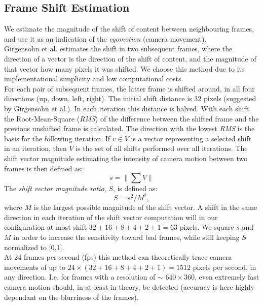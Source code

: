 \subsection{Frame Shift Estimation}\label{sec:frame_shift_estimation}
%
We estimate the magnitude of the shift of content between neighbouring frames, and use it as an indication of the \textit{egomotion} (camera movement).\\
Girgensohn et al.\cite{Girgensohn:2000:SAH:354401.354415} estimates the shift in two subsequent frames, where the direction of a vector is the direction of the shift of content, and the magnitude of that vector how many pixels it was shifted. We choose this method due to its implementational simplicity and low computational costs.\\
For each pair of subsequent frames, the latter frame is shifted around, in all four directions (up, down, left, right). The initial shift distance is 32 pixels (suggested by Girgensohn et al.). In each iteration this distance is halved. 
With each shift the Root-Mean-Square (\textit{RMS}) of the difference between the shifted frame and the previous unshifted frame is calculated. The direction with the lowest \textit{RMS} is the basis for the following iteration.
%
If $v \in V$ is a vector representing a selected shift in an iteration, then $V$ is the set of all shifts performed over all iterations. The shift vector magnitude estimating the intensity of camera motion between two frames is then defined as:
%
\[
s = \|\sum V\|
\]
%
The \textit{shift vector magnitude ratio}, $S$, is defined as:
%
\[
S = s^2 / M^2, 
\]
%
where $M$ is the largest possible magnitude of the shift vector. A shift in the same direction in each iteration of the shift vector computation will in our configuration at most shift $32+16+8+4+2+1=63$ pixels. We square $s$ and $M$ in order to increase the sensitivity toward bad frames, while still keeping $S$ normalized to [0,1].\\
%
At 24 frames per second (fps) this method can theoretically trace camera movements of up to $24 \times (32+16+8+4+2+1) = 1512$ pixels per second, in any direction. I.e. for frames with a resolution of $\sim$ $640\times360$, even extremely fast camera motion should, in at least in theory, be detected (accuracy is here highly dependant on the blurriness of the frames).
%
